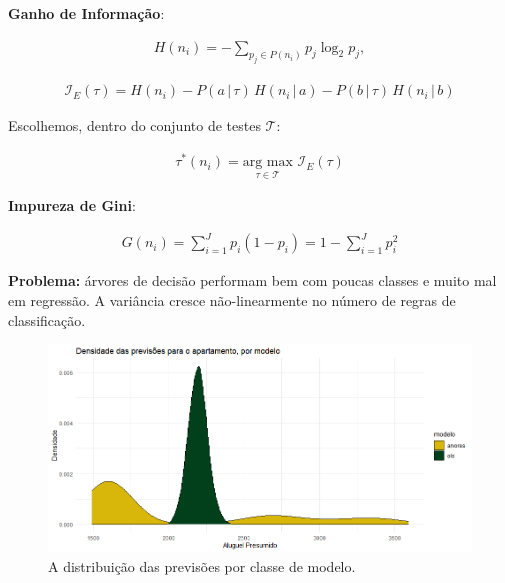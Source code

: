 \documentclass{beamer} %
\newcommand{\I}{\mathcal{I}}
\newcommand{\1}{\mathbb{I}}
\begin{document}
\begin{frame}

\textbf{Ganho de Informação}:

\begin{align}
    H(n_i) = - \sum_{p_j \in P(n_i)} p_j \log_2 p_j, 
\end{align}

\begin{align}
    \I_E(\tau) = H(n_i) - P(a\, |\, \tau) \,H(n_i \, |\,  a) - P(b \,| \,\tau)\, H(n_i \, |\,  b)
\end{align}

Escolhemos, dentro do conjunto de testes $\mathcal{T}$:

\begin{align}
    \tau^*(n_i) = \underset{\tau \in \mathcal{T}}{\text{arg max}} \, \, \I_E(\tau)
\end{align}


\textbf{Impureza de Gini}:
 
 \begin{align}
     G(n_i) = \sum_{i = 1}^J p_i ( 1  - p_i) =  1 - \sum_{i = 1}^J p_i^2
 \end{align}


\end{frame}


\begin{frame}
\textbf{Problema:} árvores de decisão performam bem com poucas classes e muito mal em regressão. A variância cresce não-linearmente no número de regras de classificação. 


\begin{figure}[H]
    \centering
    \includegraphics[scale = .40]{imagens/exemplo_var_arvores.png}
    \caption{A distribuição das previsões por classe de modelo.}
    \label{fig:arvore_var_ols}
\end{figure}
\end{frame}
\end{document}
